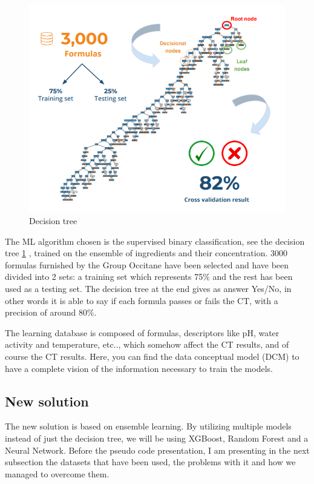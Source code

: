 \documentclass[a4paper,12pt,twoside]{report}
\begin{document}
\begin{figure}
		\includegraphics[width=\textwidth]{images/binaryTree}
	\caption[Current Decision Tree for CT prediction]{Decision tree}
\label{Decision tree}
\end{figure}
The ML algorithm chosen is the supervised binary classification, see the decision tree \ref{Decision tree} , trained on the ensemble of ingredients and their concentration. 3000 formulas furnished by the Group Occitane have been selected and have been divided into 2 sets: a training set which represents 75\% and the rest has been used as a testing set.
The decision tree at the end gives as answer Yes/No, in other words it is able to say if each formula passes or fails the CT, with a precision of around 80\%.

The learning database is composed of formulas, descriptors like pH, water activity and temperature, etc.., which somehow affect the CT results, and of course the CT results. Here, you can find the data conceptual model (DCM) to have a complete vision of the information necessary to train the models.
\subsection{New solution}
The new solution is based on ensemble learning. By utilizing multiple models instead of just the decision tree, we will be using XGBoost, Random Forest and a Neural Network. Before the pseudo code presentation, I am presenting in the next subsection the datasets that have been used, the problems with it and how we managed to overcome them.
\end{document}
